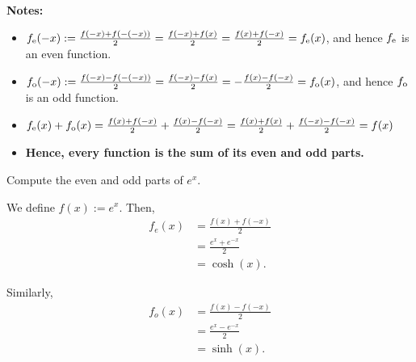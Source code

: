\begin{tcolorbox}[colback=mylightblue, title = {\bf Even and Odd Functions, and Parts of Functions}, breakable]
\bigskip
\textbf{Notes:}
\begin{itemize}
    \item $f_{\rm e}(-x) := \frac{f(-x) + f(-(-x))}{2} =  \frac{f(-x) + f(x)}{2}=  \frac{f(x) + f(-x)}{2} = f_{\rm e}(x)$, and hence $f_{\rm e}$ is an even function.
    \item $f_{\rm o}(-x) := \frac{f(-x) - f(-(-x))}{2} =  \frac{f(-x) - f(x)}{2} =   -\frac{f(x) - f(-x)}{2}= f_{\rm o}(x)$, and hence $f_{\rm o}$ is an odd function.
    \item $f_{\rm e}(x) + f_{\rm o}(x) = \frac{f(x) + f(-x)}{2} +  \frac{f(x) - f(-x)}{2} = \frac{f(x) + f(x)}{2} +  \frac{f(-x) - f(-x)}{2} = f(x)$
    \item \textbf{Hence, every function is the sum of its even and odd parts. }
    \end{itemize}

\end{tcolorbox}

\bigskip
\begin{example} Compute the even and odd parts of $e^x$.
    
\end{example}
\solutions 

We define $f(x):= e^x$. Then, 
\begin{align*}
    f_e(x) &= \frac{f(x) + f(-x)}{2} \\[1em]
     & = \frac{e^x + e^{-x}}{2} \\[1em]
     & = \cosh(x).
\end{align*}

Similarly,
\begin{align*}
    f_o(x) &= \frac{f(x) - f(-x)}{2} \\[1em]
     & = \frac{e^x - e^{-x}}{2} \\[1em]
     & = \sinh(x). 
\end{align*}


\Qed

\bigskip

